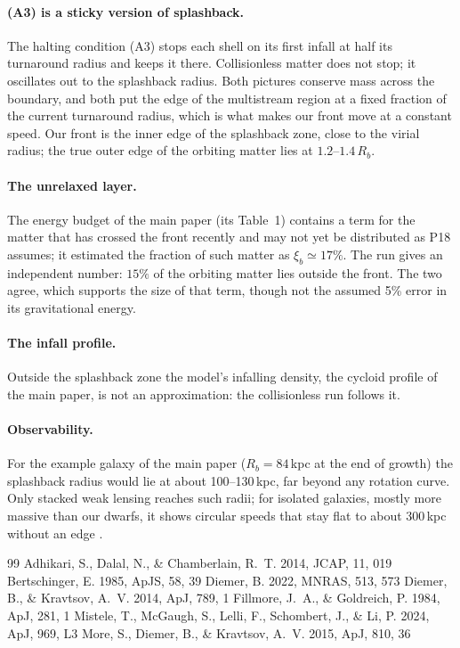 \documentclass[11pt,a4paper]{article}
\newcommand{\Rb}{R_b}
\begin{document}
\paragraph{(A3) is a sticky version of splashback.} The halting condition
(A3) stops each shell on its first infall at half its turnaround radius
and keeps it there. Collisionless matter does not stop; it oscillates
out to the splashback radius. Both pictures conserve mass across the
boundary, and both put the edge of the multistream region at a fixed
fraction of the current turnaround radius, which is what makes our front
move at a constant speed. Our front is the inner edge of the splashback
zone, close to the virial radius; the true outer edge of the orbiting
matter lies at $1.2$--$1.4\,\Rb$.

\paragraph{The unrelaxed layer.} The energy budget of the main paper
(its Table~1) contains a term for the matter that has crossed the front
recently and may not yet be distributed as P18 assumes; it estimated
the fraction of such matter as $\xi_b\simeq17\%$. The run gives an
independent number: $15\%$ of the orbiting matter lies outside the front.
The two agree, which supports the size of that term, though not the
assumed 5\% error in its gravitational energy.

\paragraph{The infall profile.} Outside the splashback zone the model's
infalling density, the cycloid profile of the main paper, is not an
approximation: the collisionless run follows it.

\paragraph{Observability.} For the example galaxy of the main paper
($\Rb=84$\,kpc at the end of growth) the splashback radius would lie at
about 100--130\,kpc, far beyond any rotation curve. Only stacked weak
lensing reaches such radii; for isolated galaxies, mostly more massive
than our dwarfs, it shows circular speeds that stay flat to about
300\,kpc without an edge \citep{Mistele2024}.

\begin{thebibliography}{99}
 Adhikari, S., Dalal, N., \& Chamberlain, R.~T. 2014, JCAP, 11, 019
 Bertschinger, E. 1985, ApJS, 58, 39
 Diemer, B. 2022, MNRAS, 513, 573
 Diemer, B., \& Kravtsov, A.~V. 2014, ApJ, 789, 1
 Fillmore, J.~A., \& Goldreich, P. 1984, ApJ, 281, 1
 Mistele, T., McGaugh, S., Lelli, F., Schombert, J., \& Li, P. 2024, ApJ, 969, L3
 More, S., Diemer, B., \& Kravtsov, A.~V. 2015, ApJ, 810, 36
\end{thebibliography}
\end{document}
